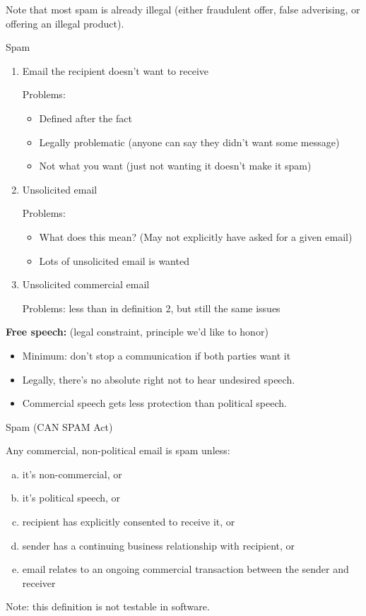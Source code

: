 Note that most spam is already illegal (either fraudulent offer, false
    adverising, or offering an illegal product).

\begin{definition}{Spam}
\begin{enumerate}
    \item Email the recipient doesn't want to receive

        Problems:
        \begin{itemize}
            \item Defined after the fact
            \item Legally problematic (anyone can say they didn't want some
                    message)
            \item Not what you want (just not wanting it doesn't make it spam)
        \end{itemize}
    \item Unsolicited email

        Problems:
        \begin{itemize}
            \item What does this mean? (May not explicitly have asked for a
                    given email)
            \item Lots of unsolicited email is wanted
        \end{itemize}
    \item Unsolicited commercial email

        Problems: less than in definition 2, but still the same issues
\end{enumerate}
\end{definition}

{\bf Free speech:} (legal constraint, principle we'd like to honor)
\begin{itemize}
    \item Minimum: don't stop a communication if both parties want it
    \item Legally, there's no absolute right not to hear undesired speech.
    \item Commercial speech gets less protection than political speech.
\end{itemize}

\begin{definition}{Spam (CAN SPAM Act)}

Any commercial, non-political email is spam unless:
\begin{enumerate}[(a)]
   \item it's non-commercial, or
   \item it's political speech, or
    \item recipient has explicitly consented to receive it, or
    \item sender has a continuing business relationship with recipient, or
    \item email relates to an ongoing commercial transaction between the sender
        and receiver
\end{enumerate}
\end{definition}
Note: this definition is not testable in software.

